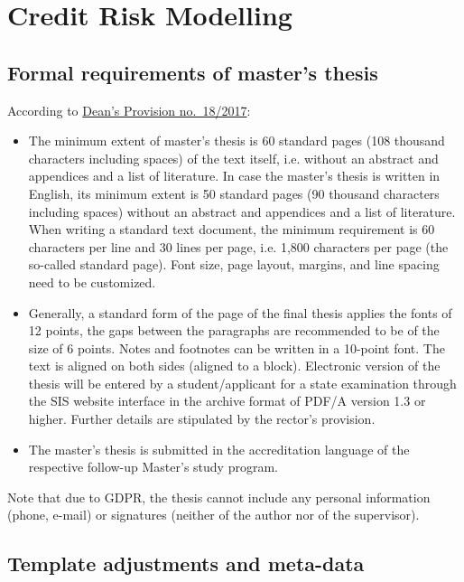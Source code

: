 \chapter{Credit Risk Modelling}
\label{chap:two}


\section{Formal requirements of master's thesis}
\label{sec:formal}

According to \href{https://www.fsv.cuni.cz/deans-provision-no-182017}{Dean's Provision no.\ 18/2017}:
\begin{itemize}
		\item  The minimum extent of master's thesis is 60 standard pages (108 thousand characters including spaces) of the text itself, i.e. without an abstract and appendices and a list of literature. In case the master's thesis is written in English, its minimum extent is 50 standard pages (90 thousand characters including spaces) without an abstract and appendices and a list of literature. When writing a standard text document, the minimum requirement is 60 characters per line and 30 lines per page, i.e. 1,800 characters per page (the so-called standard page). Font size, page layout, margins, and line spacing need to be customized.
		\item Generally, a standard form of the page of the final thesis applies the fonts of 12 points, the gaps between the paragraphs are recommended to be of the size of 6 points. Notes and footnotes can be written in a 10-point font. The text is aligned on both sides (aligned to a block). Electronic version of the thesis will be entered by a student/applicant for a state examination through the SIS website interface in the archive format of PDF/A version 1.3 or higher. Further details are stipulated by the rector's provision.
		\item The master's thesis is submitted in the accreditation language of the respective follow-up Master's study program. 
\end{itemize}

Note that due to GDPR, the thesis cannot include any personal information (phone, e-mail) or signatures (neither of the author nor of the supervisor).

\section{Template adjustments and meta-data}
\label{sec:metadata}

